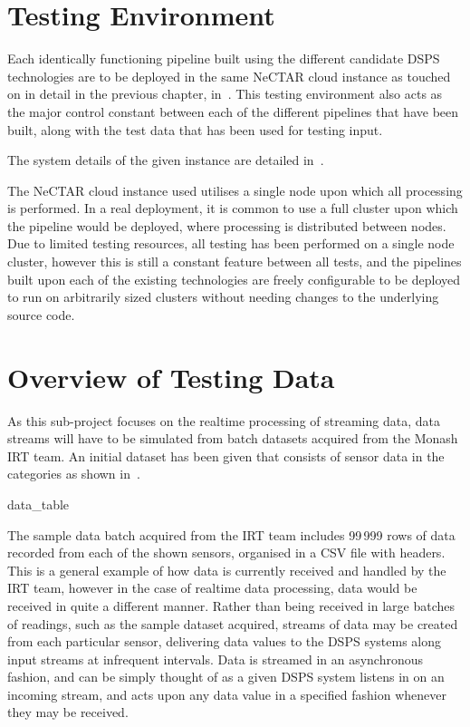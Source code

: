 \section{Testing Environment} %
\label{sub:testing_environment}

Each identically functioning pipeline built using the different candidate DSPS technologies are to be deployed in the
same NeCTAR cloud instance as touched on in detail in the previous chapter, in~.
This testing environment also acts as the major control constant between each of the different pipelines that have been
built, along with the test data that has been used for testing input.

The system details of the given instance are detailed in~.

The NeCTAR cloud instance used utilises a single node upon which all processing is performed. In a real deployment, it is
common to use a full cluster upon which the pipeline would be deployed, where processing is distributed between nodes. Due to
limited testing resources, all testing
has been performed on a single node cluster, however this is still a constant feature between all tests, and the pipelines built upon
each of the existing technologies are freely configurable to be deployed to run on arbitrarily sized clusters without
needing changes to the underlying source code.



\section{Overview of Testing Data} %
\label{sub:overview_of_test_data}

As this sub-project focuses on the realtime processing of streaming data, data streams will have to be simulated from
batch datasets acquired from the Monash IRT team. An initial dataset has been given that consists of sensor data in the
categories as shown in~.

{data_table}

The sample data batch acquired from the IRT team includes 99\,999 rows of data recorded from each of the shown sensors,
organised in a CSV file with headers. This is a general example of how data is currently received and handled by the IRT
team, however in the case of realtime data processing, data would be received in quite a different manner. Rather than
being received in large batches of readings, such as the sample dataset acquired, streams of data may be created from
each particular sensor, delivering data values to the DSPS systems along input streams at infrequent intervals. Data
is streamed in an asynchronous fashion, and can be simply thought of as a given DSPS system listens in on an incoming stream, and
acts upon any data value in a specified fashion whenever they may be received.

